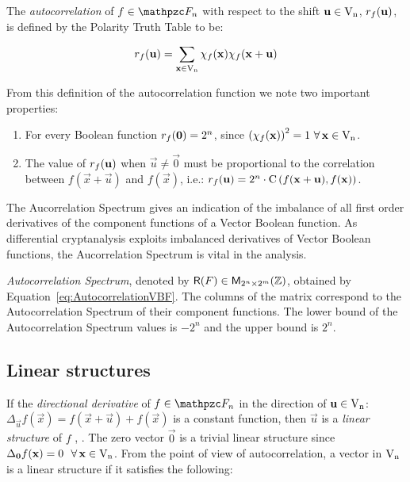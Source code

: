The \textit{autocorrelation} of $f \in \funct{F}_n$ with respect to the shift $\vec{u} \in \gf{V_n}$, $\R_{f}(\vec{u})$, is defined by the Polarity Truth Table to be:

\begin{equation}
\R_f(\vec{u}) = \sum_{\vec{x} \in \gf{V_n}} \chi_f(\vec{x})
\chi_f(\vec{x}+\vec{u})
\end{equation}

From this definition of the autocorrelation function we note two important properties:

\begin{enumerate}
\item For every Boolean function $\R_f(\vec{0})=2^n$, since $\left(\chi_f(\vec{x}) \right)^2 = 1 \ \fa \vec{x} \in \gf{V_n}$.

\item The value of $\R_f(\vec{u})$ when $\vec{u} \neq \vec{0}$ must be proportional to the correlation between $f(\vec{x}+\vec{u})$ and $f(\vec{x})$, i.e.: $\R_f(\vec{u}) = 2^n \cdot \Cor \left(f(\vec{x}+\vec{u}),f(\vec{x}) \right)$.  

\end{enumerate}

The Aucorrelation Spectrum gives an indication of the imbalance of all first order derivatives of the component functions of a Vector Boolean function. As differential cryptanalysis exploits imbalanced derivatives of Vector Boolean functions, the Aucorrelation Spectrum is vital in the analysis.

\begin{definition}
\textit{Autocorrelation Spectrum}, denoted by $\matr{R}(F) \in
  \matr{M}_{2^n \times 2^m}(\bbbz)$, obtained by Equation~\ref{eq:AutocorrelationVBF}. The columns of the matrix correspond to the Autocorrelation Spectrum of their component functions. The lower bound of the Autocorrelation Spectrum values is $-2^n$ and the upper bound is $2^n$.
\end{definition}

\subsection{Linear structures}\label{sec:LinearStructure}

If the \textit{directional derivative} of $f \in \funct{F}_n$ in the direction of $\vec{u} \in \gf{V_n}$: $\Delta_{\vec{u}}f(\vec{x}) = f(\vec{x}+\vec{u}) + f(\vec{x})$ is a constant function, then $\vec{u}$ is a \textit{linear structure} of $f$  \cite{Lai:95}, \cite{Chaum:E85}. The zero vector $\vec{0}$ is a trivial linear structure since $\Delta_{\vec{0}}f(\vec{x}) = 0 \ \ \fa \vec{x} \in \gf{V_n}$. From the point of view of autocorrelation, a vector in $\gf{V_n}$ is a linear structure if it satisfies the following:

